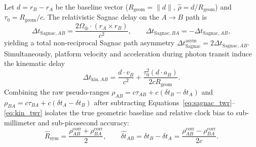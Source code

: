 \documentclass[11pt,a4paper,reqno]{article}
\def\bm#1{#1}%
\theoremstyle{plain}
\theoremstyle{definition}
\theoremstyle{remark}
\numberwithin{equation}{section}
\begin{document}
Let $\bm{d} = \bm{r}_B - \bm{r}_A$ be the baseline vector ($R_{\text{geom}} = \|\bm{d}\|$, $\hat{\bm{\rho}} = \bm{d}/R_{\text{geom}}$) and $\tau_0 = R_{\text{geom}} / c$. The relativistic Sagnac delay on the $A \to B$ path is
\begin{equation}
  \Delta t_{\text{Sagnac},AB} = \frac{2 \bm{\Omega}_\oplus \cdot (\bm{r}_A \times \bm{r}_B)}{c^2}, \qquad \Delta t_{\text{Sagnac},BA} = -\Delta t_{\text{Sagnac},AB},
  \label{eq:sagnac_twr}
\end{equation}
yielding a total non-reciprocal Sagnac path asymmetry $\Delta t_{\text{Sagnac}}^{\text{asym}} = 2\Delta t_{\text{Sagnac},AB}$. Simultaneously, platform velocity and acceleration during photon transit induce the kinematic delay
\begin{equation}
  \Delta t_{\text{kin},AB} = \frac{\bm{d} \cdot \bm{v}_B}{c^2} + \frac{\tau_0^2 (\bm{d} \cdot \bm{a}_B)}{2 c R_{\text{geom}}}.
  \label{eq:kin_twr}
\end{equation}
Combining the raw pseudo-ranges $\rho_{AB} = c\tau_{AB} + c(\delta t_B - \delta t_A)$ and $\rho_{BA} = c\tau_{BA} + c(\delta t_A - \delta t_B)$ after subtracting Equations~\eqref{eq:sagnac_twr}--\eqref{eq:kin_twr} isolates the true geometric baseline and relative clock bias to sub-millimeter and sub-picosecond accuracy:
\begin{equation}
  \hat{R}_{\text{sym}} = \frac{\rho_{AB}^{\text{corr}} + \rho_{BA}^{\text{corr}}}{2}, \qquad \widehat{\delta t}_{AB} = \delta t_B - \delta t_A = \frac{\rho_{AB}^{\text{corr}} - \rho_{BA}^{\text{corr}}}{2c}.
  \label{eq:twr_decoupling}
\end{equation}
\end{document}
